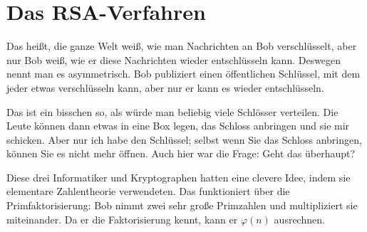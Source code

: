 \begin{math-stroke}
\end{math-stroke}

\section{Das RSA-Verfahren}

\begin{spoken-clean}[01:20:54 - 01:23:24]
Das heißt, die ganze Welt weiß, wie man Nachrichten an Bob verschlüsselt, aber nur Bob weiß, wie er diese Nachrichten wieder entschlüsseln kann. Deswegen nennt man es asymmetrisch. Bob publiziert einen öffentlichen Schlüssel, mit dem jeder etwas verschlüsseln kann, aber nur er kann es wieder entschlüsseln.

Das ist ein bisschen so, als würde man beliebig viele Schlösser verteilen. Die Leute können dann etwas in eine Box legen, das Schloss anbringen und sie mir schicken. Aber nur ich habe den Schlüssel; selbst wenn Sie das Schloss anbringen, können Sie es nicht mehr öffnen. Auch hier war die Frage: Geht das überhaupt?

Diese drei Informatiker und Kryptographen hatten eine clevere Idee, indem sie elementare Zahlentheorie verwendeten. Das funktioniert über die Primfaktorisierung: Bob nimmt zwei sehr große Primzahlen und multipliziert sie miteinander. Da er die Faktorisierung kennt, kann er $\varphi(n)$ ausrechnen.
\end{spoken-clean}

